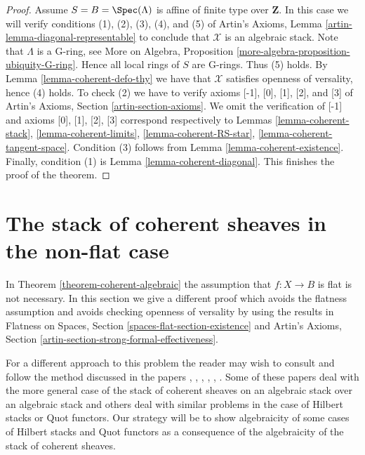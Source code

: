 \begin{proof}
\medskip\noindent
Assume $S = B = \Spec(\Lambda)$ is affine of finite type over $\mathbf{Z}$.
In this case we will verify conditions (1), (2), (3), (4), and (5) of
Artin's Axioms, Lemma \ref{artin-lemma-diagonal-representable}
to conclude that $\mathcal{X}$ is an algebraic stack.
Note that $\Lambda$ is a G-ring, see
More on Algebra, Proposition \ref{more-algebra-proposition-ubiquity-G-ring}.
Hence all local rings of $S$ are G-rings. Thus (5) holds.
By Lemma \ref{lemma-coherent-defo-thy}
we have that $\mathcal{X}$ satisfies openness of versality, hence (4) holds.
To check (2) we have to verify axioms [-1], [0], [1], [2], and [3]
of Artin's Axioms, Section \ref{artin-section-axioms}.
We omit the verification of [-1] and axioms
[0], [1], [2], [3] correspond respectively to
Lemmas \ref{lemma-coherent-stack},
\ref{lemma-coherent-limits},
\ref{lemma-coherent-RS-star},
\ref{lemma-coherent-tangent-space}.
Condition (3) follows from Lemma \ref{lemma-coherent-existence}.
Finally, condition (1) is Lemma \ref{lemma-coherent-diagonal}.
This finishes the proof of the theorem.
\end{proof}








\section{The stack of coherent sheaves in the non-flat case}
\label{section-not-flat}

\noindent
In Theorem \ref{theorem-coherent-algebraic} the assumption that $f : X \to B$
is flat is not necessary. In this section we give a different proof
which avoids the flatness assumption and avoids checking openness
of versality by using the results
in Flatness on Spaces, Section \ref{spaces-flat-section-existence} and
Artin's Axioms, Section \ref{artin-section-strong-formal-effectiveness}.

\medskip\noindent
For a different approach to this problem the reader may wish to consult
\cite{ArtinI} and follow the method discussed in the papers
\cite{olsson-starr}, \cite{lieblich_remarks}, \cite{olsson_proper},
\cite{Hall-Rydh}, \cite{Hall-Rydh-Hilbert}, \cite{rydh_representability}.
Some of these papers deal with the more general case of the stack of
coherent sheaves on an algebraic stack over an algebraic stack and
others deal with similar problems in the case of Hilbert stacks
or Quot functors. Our strategy will be to show algebraicity of some
cases of Hilbert stacks and Quot functors as a consequence of the
algebraicity of the stack of coherent sheaves.

